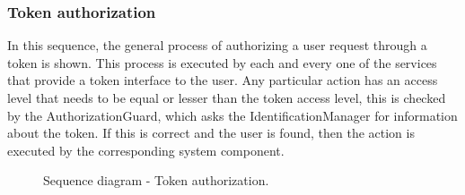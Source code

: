 \subsubsection{Token authorization}
In this sequence, the general process of authorizing a user request through a token is shown. This process is executed by each and every one of the services that provide a token interface to the user. Any particular action has an access level that needs to be equal or lesser than the token access level, this is checked by the AuthorizationGuard, which asks the IdentificationManager for information about the token.
If this is correct and the user is found, then the action is executed by the corresponding system component.
\begin{figure}[H]
    \centering
    \caption{\label{fig:sequence-token-auth}Sequence diagram - Token authorization.}
\end{figure}

